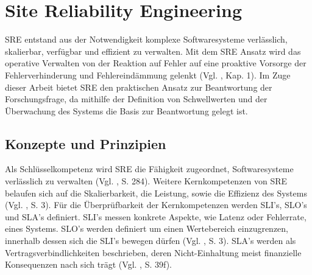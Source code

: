 \documentclass[
12pt,
a4paper,
twoside,
openright
]{report}
\begin{document}
	\section{Site Reliability Engineering}
	SRE entstand aus der Notwendigkeit komplexe Softwaresysteme verlässlich, skalierbar, verfügbar und effizient zu verwalten. Mit dem SRE Ansatz wird das operative Verwalten von der Reaktion auf Fehler auf eine proaktive Vorsorge der Fehlerverhinderung und Fehlereindämmung gelenkt (Vgl. \parencite{gopikrishna2025site}, Kap. 1). Im Zuge dieser Arbeit bietet SRE den praktischen Ansatz zur Beantwortung der Forschungsfrage, da mithilfe der Definition von Schwellwerten und der Überwachung des Systems die Basis zur Beantwortung gelegt ist.
	
	\subsection{Konzepte und Prinzipien}
	Als Schlüsselkompetenz wird SRE die Fähigkeit zugeordnet, Softwaresysteme verlässlich zu verwalten (Vgl. \parencite{BenefSRE}, S. 284). Weitere Kernkompetenzen von SRE belaufen sich auf die Skalierbarkeit, die Leistung, sowie die Effizienz des Systems (Vgl. \parencite{gopikrishna2025site}, S. 3).
	Für die Überprüfbarkeit der Kernkompetenzen werden SLI’s, SLO’s und SLA’s definiert. SLI’s messen konkrete Aspekte, wie Latenz oder Fehlerrate, eines Systems. SLO’s werden definiert um einen Wertebereich einzugrenzen, innerhalb dessen sich die SLI’s bewegen dürfen (Vgl. \parencite{gopikrishna2025site}, S. 3). SLA's werden als Vertragsverbindlichkeiten beschrieben, deren Nicht-Einhaltung meist finanzielle Konsequenzen nach sich trägt (Vgl. \parencite{GoogleSRE}, S. 39f).

	
\end{document}

